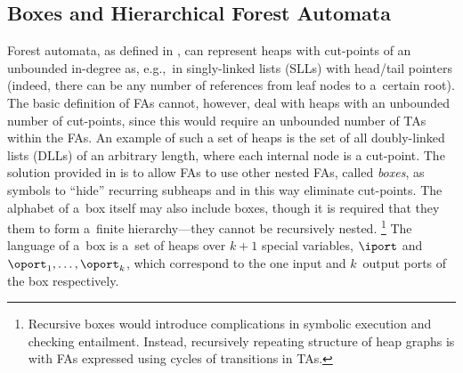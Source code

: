 \subsection{Boxes and Hierarchical Forest Automata}\label{sec:boxes}
Forest automata, as defined in , can represent heaps with
cut-points of an unbounded in-degree as,
e.g.,~in singly-linked lists (SLLs) with head/tail pointers (indeed, there can be any number of
references from leaf nodes to a~certain root).
The basic definition of FAs cannot, however, deal with
heaps with an unbounded number of cut-points, since this would require
an unbounded number of TAs within the FAs.
An example of such a set of heaps is the
set of all doubly-linked lists (DLLs) of an arbitrary length, where each internal node is a cut-point.
The solution provided in \cite{forester11} is to allow FAs to use
other nested FAs, called \emph{boxes}, as symbols to ``hide'' recurring
subheaps 
and in this way eliminate
cut-points. 
%
The alphabet of a~box itself may also include boxes, though it is required that they them
to form a~finite hierarchy---they cannot be recursively nested.%
\footnote{Recursive boxes would introduce complications in symbolic execution
and checking entailment. Instead, recursively repeating structure of heap graphs is
with FAs expressed using cycles of transitions in TAs.}%
%
The language of a~box is a~set of heaps over $k+1$ special variables, $\iport$
and $\oport_1, \ldots, \oport_k$, which correspond to the one input and
$k$~output ports of the box respectively.

